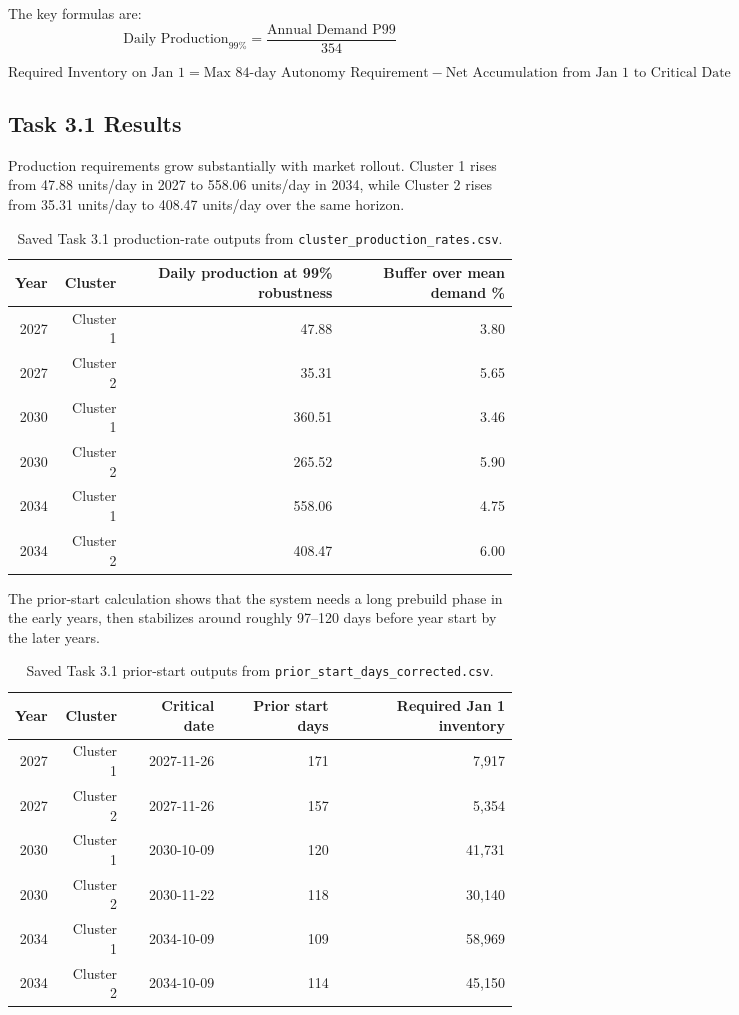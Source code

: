 \documentclass[11pt]{article}
\begin{document}
The key formulas are:
\[
\text{Daily Production}_{99\%} =
\frac{\text{Annual Demand P99}}{354}
\]

\[
\text{Required Inventory on Jan 1} =
\text{Max 84-day Autonomy Requirement} -
\text{Net Accumulation from Jan 1 to Critical Date}
\]

\subsection{Task 3.1 Results}

Production requirements grow substantially with market rollout. Cluster 1 rises from
47.88 units/day in 2027 to 558.06 units/day in 2034, while Cluster 2 rises from
35.31 units/day to 408.47 units/day over the same horizon.

\begin{table}[H]
\centering
\small
\begin{tabular}{rrrr}
\toprule
Year & Cluster & Daily production at 99\% robustness & Buffer over mean demand \% \\
\midrule
2027 & Cluster 1 & 47.88 & 3.80 \\
2027 & Cluster 2 & 35.31 & 5.65 \\
2030 & Cluster 1 & 360.51 & 3.46 \\
2030 & Cluster 2 & 265.52 & 5.90 \\
2034 & Cluster 1 & 558.06 & 4.75 \\
2034 & Cluster 2 & 408.47 & 6.00 \\
\bottomrule
\end{tabular}
\caption{Saved Task 3.1 production-rate outputs from \texttt{cluster\_production\_rates.csv}.}
\end{table}

The prior-start calculation shows that the system needs a long prebuild phase in the
early years, then stabilizes around roughly 97--120 days before year start by the
later years.

\begin{table}[H]
\centering
\small
\begin{tabular}{rrrrr}
\toprule
Year & Cluster & Critical date & Prior start days & Required Jan 1 inventory \\
\midrule
2027 & Cluster 1 & 2027-11-26 & 171 & 7,917 \\
2027 & Cluster 2 & 2027-11-26 & 157 & 5,354 \\
2030 & Cluster 1 & 2030-10-09 & 120 & 41,731 \\
2030 & Cluster 2 & 2030-11-22 & 118 & 30,140 \\
2034 & Cluster 1 & 2034-10-09 & 109 & 58,969 \\
2034 & Cluster 2 & 2034-10-09 & 114 & 45,150 \\
\bottomrule
\end{tabular}
\caption{Saved Task 3.1 prior-start outputs from \texttt{prior\_start\_days\_corrected.csv}.}
\end{table}
\end{document}
